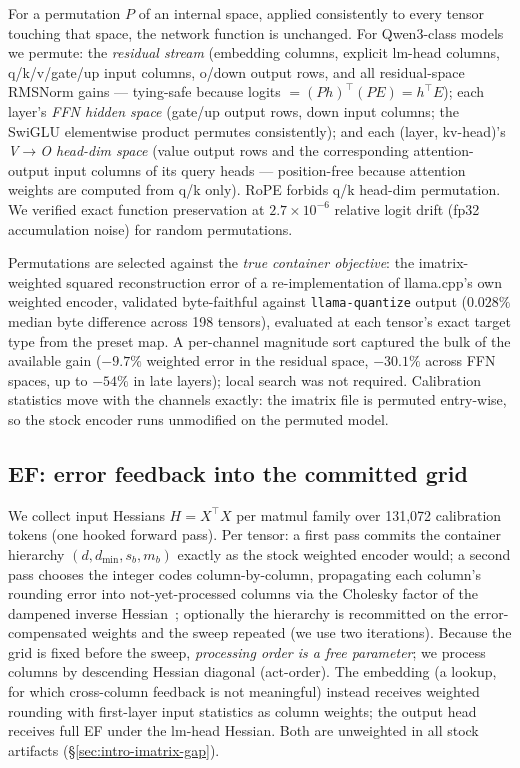 \documentclass[11pt]{article}
\begin{document}
For a permutation $P$ of an internal space, applied consistently to every tensor
touching that space, the network function is unchanged. For Qwen3-class models we
permute: the \emph{residual stream} (embedding columns, explicit lm-head columns,
q/k/v/gate/up input columns, o/down output rows, and all residual-space RMSNorm
gains --- tying-safe because logits $= (Ph)^\top (PE) = h^\top E$); each layer's
\emph{FFN hidden space} (gate/up output rows, down input columns; the SwiGLU
elementwise product permutes consistently); and each (layer, kv-head)'s
\emph{V$\to$O head-dim space} (value output rows and the corresponding attention-output
input columns of its query heads --- position-free because attention weights are
computed from q/k only). RoPE forbids q/k head-dim permutation. We verified exact
function preservation at $2.7\times10^{-6}$ relative logit drift (fp32 accumulation
noise) for random permutations.

Permutations are selected against the \emph{true container objective}: the
imatrix-weighted squared reconstruction error of a re-implementation of llama.cpp's
own weighted encoder, validated byte-faithful against \texttt{llama-quantize} output
($0.028\%$ median byte difference across 198 tensors), evaluated at each tensor's
exact target type from the preset map. A per-channel magnitude sort captured the
bulk of the available gain ($-9.7\%$ weighted error in the residual space, $-30.1\%$
across FFN spaces, up to $-54\%$ in late layers); local search was not required.
Calibration statistics move with the channels exactly: the imatrix file is permuted
entry-wise, so the stock encoder runs unmodified on the permuted model.

\subsection{EF: error feedback into the committed grid}
\label{sec:ef}

We collect input Hessians $H = X^\top X$ per matmul family over 131{,}072 calibration
tokens (one hooked forward pass). Per tensor: a first pass commits the container
hierarchy $(d, d_{\min}, s_b, m_b)$ exactly as the stock weighted encoder would; a
second pass chooses the integer codes column-by-column, propagating each column's
rounding error into not-yet-processed columns via the Cholesky factor of the dampened
inverse Hessian~\cite{gptq}; optionally the hierarchy is recommitted on the
error-compensated weights and the sweep repeated (we use two iterations). Because the
grid is fixed before the sweep, \emph{processing order is a free parameter}; we
process columns by descending Hessian diagonal (act-order). The embedding (a lookup,
for which cross-column feedback is not meaningful) instead receives weighted rounding
with first-layer input statistics as column weights; the output head receives full EF
under the lm-head Hessian. Both are unweighted in all stock artifacts
(\S\ref{sec:intro-imatrix-gap}).
\end{document}
